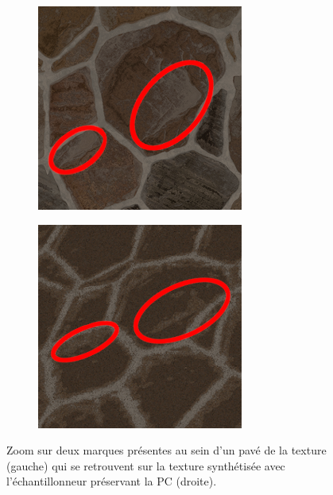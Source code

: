 \begin{figure}
    \centering
    \begin{subfigure}{.45\textwidth}
        \centering
        \includegraphics[width=\textwidth]{contenu/resources/images/marks}
    \end{subfigure}
    \hfill
    \begin{subfigure}{.45\textwidth}
        \centering
        \includegraphics[width=\textwidth]{contenu/resources/images/mark_preserved}
    \end{subfigure}

    \caption[L'échantillonneur préserve partiellement les marques dans les pavés]{Zoom sur deux marques présentes au sein d'un pavé de la texture (gauche) qui se retrouvent sur la texture synthétisée avec l'échantillonneur préservant la PC (droite).}
    \label{fig:mark-preserved}
\end{figure}
